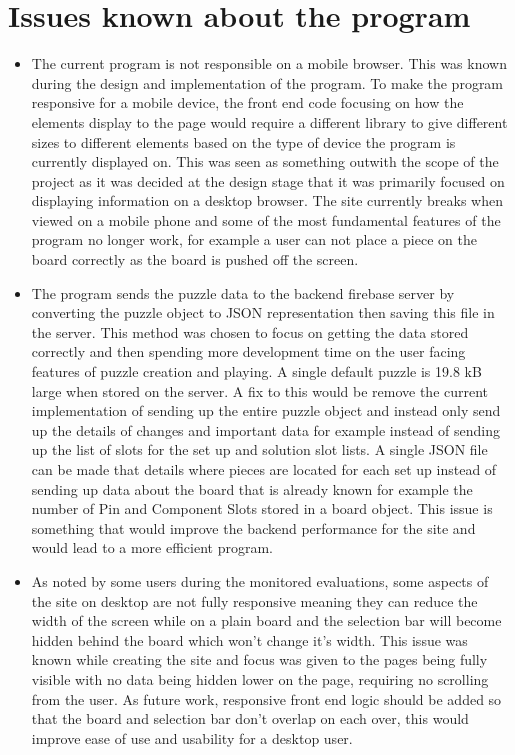 \documentclass{l4proj}
\begin{document}
\section{Issues known about the program}
\begin{itemize}
    \item The current program is not responsible on a mobile browser. This was known during the design and implementation of the program. To make the program responsive for a mobile device, the front end code focusing on how the elements display to the page would require a different library to give different sizes to different elements based on the type of device the program is currently displayed on. This was seen as something outwith the scope of the project as it was decided at the design stage that it was primarily focused on displaying information on a desktop browser. The site currently breaks when viewed on a mobile phone and some of the most fundamental features of the program no longer work, for example a user can not place a piece on the board correctly as the board is pushed off the screen.
    \item The program sends the puzzle data to the backend firebase server by converting the puzzle object to JSON representation then saving this file in the server. This method was chosen to focus on getting the data stored correctly and then spending more development time on the user facing features of puzzle creation and playing. A single default puzzle is 19.8 kB large when stored on the server. A fix to this would be remove the current implementation of sending up the entire puzzle object and instead only send up the details of changes and important data for example instead of sending up the list of slots for the set up and solution slot lists. A single JSON file can be made that details where pieces are located for each set up instead of sending up data about the board that is already known for example the number of Pin and Component Slots stored in a board object. This issue is something that would improve the backend performance for the site and would lead to a more efficient program.
    \item As noted by some users during the monitored evaluations, some aspects of the site on desktop are not fully responsive meaning they can reduce the width of the screen while on a plain board and the selection bar will become hidden behind the board which won't change it's width. This issue was known while creating the site and focus was given to the pages being fully visible with no data being hidden lower on the page, requiring no scrolling from the user. As future work, responsive front end logic should be added so that the board and selection bar don't overlap on each over, this would improve ease of use and usability for a desktop user.

\end{itemize}
\end{document}
